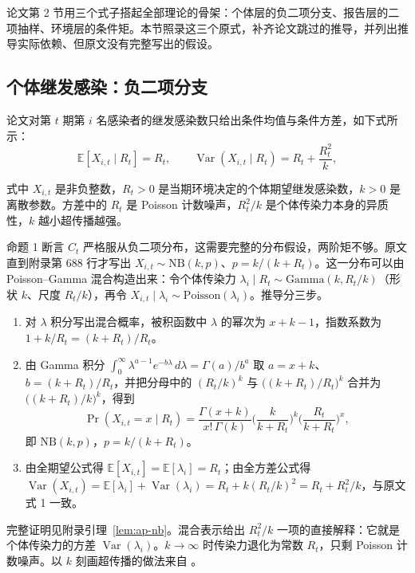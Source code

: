 论文第 2 节用三个式子搭起全部理论的骨架：个体层的负二项分支、报告层的二项抽样、环境层的条件矩。本节照录这三个原式，补齐论文跳过的推导，并列出推导实际依赖、但原文没有完整写出的假设。

\subsection{个体继发感染：负二项分支}

论文对第 $t$ 期第 $i$ 名感染者的继发感染数只给出条件均值与条件方差，如下式所示：
\begin{equation*}
\mathbb{E}[X_{i,t} \mid R_t] = R_t, \qquad
\operatorname{Var}(X_{i,t} \mid R_t) = R_t + \frac{R_t^2}{k}, \tag{原文式 1}
\end{equation*}

式中 $X_{i,t}$ 是非负整数，$R_t>0$ 是当期环境决定的个体期望继发感染数，$k>0$ 是离散参数。方差中的 $R_t$ 是 Poisson 计数噪声，$R_t^2/k$ 是个体传染力本身的异质性，$k$ 越小超传播越强。

命题 1 断言 $C_t$ 严格服从负二项分布，这需要完整的分布假设，两阶矩不够。原文直到附录第 688 行才写出 $X_{i,t}\sim\mathrm{NB}(k,p)$、$p=k/(k+R_t)$。这一分布可以由 Poisson--Gamma 混合构造出来：令个体传染力 $\lambda_i\mid R_t\sim\mathrm{Gamma}(k,R_t/k)$（形状 $k$、尺度 $R_t/k$），再令 $X_{i,t}\mid\lambda_i\sim\mathrm{Poisson}(\lambda_i)$。推导分三步。

\begin{enumerate}
\item 对 $\lambda$ 积分写出混合概率，被积函数中 $\lambda$ 的幂次为 $x+k-1$，指数系数为 $1+k/R_t=(k+R_t)/R_t$。
\item 由 Gamma 积分 $\int_0^\infty\lambda^{a-1}e^{-b\lambda}\,d\lambda=\Gamma(a)/b^a$ 取 $a=x+k$、$b=(k+R_t)/R_t$，并把分母中的 $(R_t/k)^k$ 与 $\big((k+R_t)/R_t\big)^k$ 合并为 $\big((k+R_t)/k\big)^k$，得到
\begin{equation*}
\Pr(X_{i,t}=x\mid R_t)=\frac{\Gamma(x+k)}{x!\,\Gamma(k)}\Big(\frac{k}{k+R_t}\Big)^{k}\Big(\frac{R_t}{k+R_t}\Big)^{x},
\end{equation*}
即 $\mathrm{NB}(k,p)$，$p=k/(k+R_t)$。
\item 由全期望公式得 $\mathbb{E}[X_{i,t}]=\mathbb{E}[\lambda_i]=R_t$；由全方差公式得 $\operatorname{Var}(X_{i,t})=\mathbb{E}[\lambda_i]+\operatorname{Var}(\lambda_i)=R_t+k(R_t/k)^2=R_t+R_t^2/k$，与原文式 1 一致。
\end{enumerate}

完整证明见附录引理~\ref{lem:ap-nb}。混合表示给出 $R_t^2/k$ 一项的直接解释：它就是个体传染力的方差 $\operatorname{Var}(\lambda_i)$。$k\to\infty$ 时传染力退化为常数 $R_t$，只剩 Poisson 计数噪声。以 $k$ 刻画超传播的做法来自 \citet{lloydsmith2005superspreading}。

